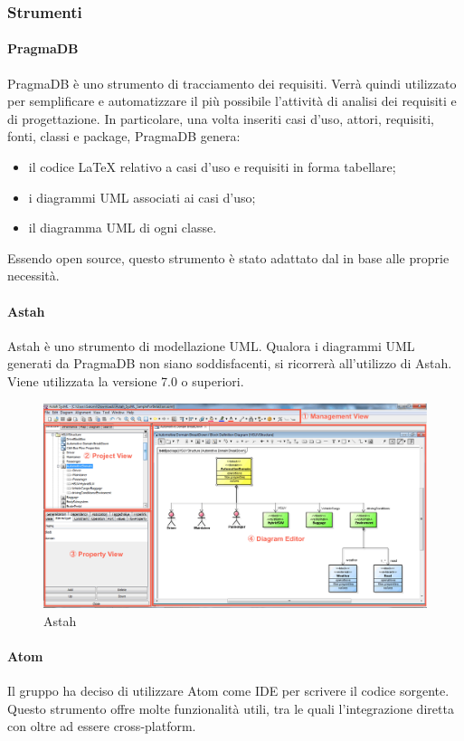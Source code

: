 \subsubsection{Strumenti}
 \paragraph{PragmaDB}
  PragmaDB è uno strumento  di tracciamento dei requisiti. Verrà quindi utilizzato per semplificare e automatizzare il più possibile l'attività di analisi dei requisiti e di progettazione. In particolare, una volta inseriti casi d'uso, attori, requisiti, fonti, classi e package, PragmaDB genera:
  \begin{itemize}
  \item il codice \LaTeX{} relativo a casi d'uso e requisiti in forma tabellare;
  \item i diagrammi UML associati ai casi d'uso;
  \item il diagramma UML di ogni classe.

  \end{itemize}
  Essendo open source, questo strumento è stato adattato dal  \GRUPPO{} in base alle proprie necessità.
  \paragraph{Astah}
  Astah è uno strumento di modellazione UML. Qualora i diagrammi UML generati da PragmaDB non siano soddisfacenti, si ricorrerà all'utilizzo di Astah. Viene utilizzata la versione 7.0 o superiori.
\begin{figure}[h]
\centering
\includegraphics[scale=0.3]{img/astah.png}
\caption{Astah}\label{sec:Figura1}
\end{figure}

\paragraph{Atom}
Il gruppo ha deciso di utilizzare Atom come IDE per scrivere il codice sorgente. Questo strumento offre molte funzionalità utili, tra le quali l'integrazione diretta con  oltre ad essere cross-platform.

